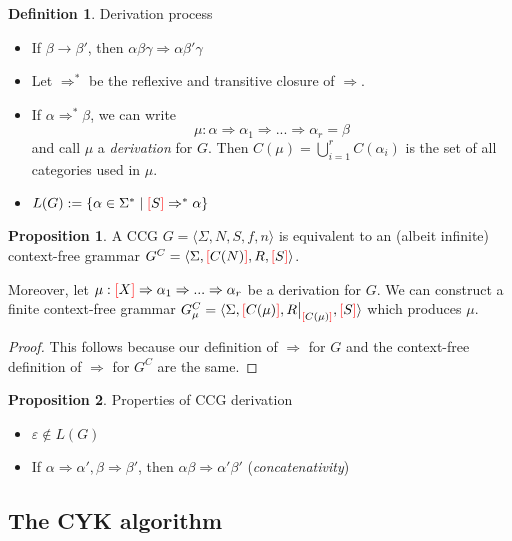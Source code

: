\documentclass[12pt]{extarticle}
\newcommand\restr[2]{{%
  \left.\kern-\nulldelimiterspace %
  #1 %
  \vphantom{\big|} %
  \right|_{#2} %
  }}
\theoremstyle{definition} \newtheorem{defn}{Definition}
\theoremstyle{definition} \newtheorem{prop}{Proposition}
\newcommand{\lb}{\textcolor{red}{[}}
\newcommand{\rb}{\textcolor{red}{]}}
\begin{document}
\begin{defn}
    Derivation process
    \begin{itemize}
        \item If $\beta \rightarrow \beta'$, then $\alpha \beta \gamma \Rightarrow \alpha \beta' \gamma$
        \item Let $\Rightarrow^*$ be the reflexive and transitive closure of $\Rightarrow$.
        \item If $\alpha \Rightarrow^* \beta$, we can write
            \[ \mu: \alpha \Rightarrow \alpha_1 \Rightarrow ... \Rightarrow \alpha_r = \beta \]
            and call $\mu$ a \emph{derivation} for $G$. Then $C(\mu) = \bigcup\limits_{i=1}^{r} C(\alpha_i)$
            is the set of all categories used in $\mu$.
        \item $L(G) := \{ \alpha \in \Sigma^* \mid \lb S \rb \Rightarrow^* \alpha \}$
    \end{itemize}
\end{defn}

\begin{prop}
    A CCG $G = \langle \Sigma, N, S, f, n \rangle$ is equivalent to an
    (albeit infinite) context-free grammar
    $G^C = \langle \Sigma, \lb C(N) \rb, R, \lb S \rb \rangle$.

    Moreover, let $\mu: \lb X \rb \Rightarrow \alpha_1 \Rightarrow ... \Rightarrow \alpha_r$
    be a derivation for $G$.
    We can construct a finite context-free grammar
    $G_\mu^C = \langle \Sigma, \lb C(\mu) \rb, \restr{R}{\lb C(\mu) \rb}, \lb S \rb \rangle$
    which produces $\mu$.
\end{prop}
\begin{proof}
    This follows because our definition of $\Rightarrow$ for $G$ and the context-free
    definition of $\Rightarrow$ for $G^C$ are the same.
\end{proof}

\begin{prop}
    Properties of CCG derivation
    \begin{itemize}
        \item $\varepsilon \notin L(G)$
        \item If $\alpha \Rightarrow \alpha', \beta \Rightarrow \beta'$,
              then $\alpha \beta \Rightarrow \alpha' \beta'$
              (\emph{concatenativity})
    \end{itemize}
\end{prop}

\subsection{The CYK algorithm}
\end{document}
